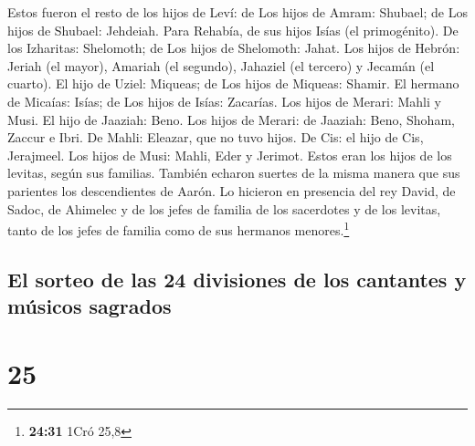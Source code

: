 Estos fueron el resto de los hijos de Leví: de Los hijos
de Amram: Shubael; de Los hijos de Shubael: Jehdeiah. 
Para Rehabía, de sus hijos Isías (el primogénito).  De
los Izharitas: Shelomoth; de Los hijos de Shelomoth: Jahat.
 Los hijos de Hebrón: Jeriah (el mayor), Amariah (el
segundo), Jahaziel (el tercero) y Jecamán (el cuarto). 
El hijo de Uziel: Miqueas; de Los hijos de Miqueas: Shamir.
 El hermano de Micaías: Isías; de Los hijos de Isías:
Zacarías.  Los hijos de Merari: Mahli y Musi. El hijo de
Jaaziah: Beno.  Los hijos de Merari: de Jaaziah: Beno,
Shoham, Zaccur e Ibri.  De Mahli: Eleazar, que no tuvo
hijos.  De Cis: el hijo de Cis, Jerajmeel.
 Los hijos de Musi: Mahli, Eder y Jerimot. Estos eran los
hijos de los levitas, según sus familias.  También
echaron suertes de la misma manera que sus parientes los descendientes
de Aarón. Lo hicieron en presencia del rey David, de Sadoc, de Ahimelec
y de los jefes de familia de los sacerdotes y de los levitas, tanto de
los jefes de familia como de sus hermanos menores.\footnote{\textbf{24:31}
  1Cró 25,8}

\hypertarget{el-sorteo-de-las-24-divisiones-de-los-cantantes-y-muxfasicos-sagrados}{%
\subsection{El sorteo de las 24 divisiones de los cantantes y músicos
sagrados}\label{el-sorteo-de-las-24-divisiones-de-los-cantantes-y-muxfasicos-sagrados}}

\hypertarget{section-24}{%
\section{25}\label{section-24}}

